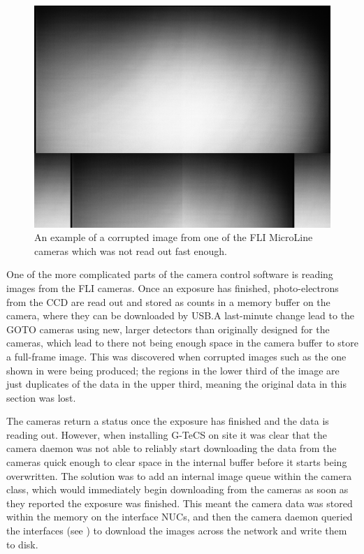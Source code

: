 \begin{colsection}
\begin{figure}[t]
    \begin{center}
        \includegraphics[width=0.7\linewidth]{images/cam_readout.png}
    \end{center}
    \caption[A corrupted image which was not read out fast enough]{
        An example of a corrupted image from one of the FLI MicroLine cameras which was not read out fast enough.
    }\label{fig:cam_readout}
\end{figure}

One of the more complicated parts of the camera control software is reading images from the FLI cameras. Once an exposure has finished, photo-electrons from the CCD are read out and stored as counts in a memory buffer on the camera, where they can be downloaded by USB.\@ A last-minute change lead to the GOTO cameras using new, larger detectors than originally designed for the cameras, which lead to there not being enough space in the camera buffer to store a full-frame image. This was discovered when corrupted images such as the one shown in  were being produced; the regions in the lower third of the image are just duplicates of the data in the upper third, meaning the original data in this section was lost.

The cameras return a  status once the exposure has finished and the data is reading out. However, when installing G-TeCS on site it was clear that the camera daemon was not able to reliably start downloading the data from the cameras quick enough to clear space in the internal buffer before it starts being overwritten. The solution was to add an internal image queue within the camera class, which would immediately begin downloading from the cameras as soon as they reported the exposure was finished. This meant the camera data was stored within the memory on the interface NUCs, and then the camera daemon queried the  interfaces (see ) to download the images across the network and write them to disk.


\end{colsection}

